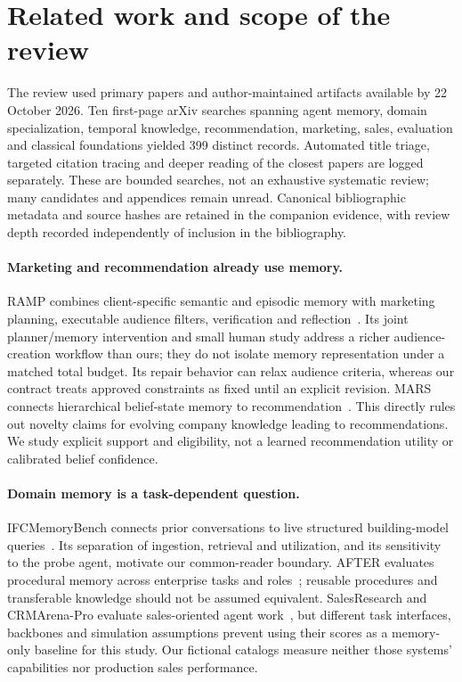 \section{Related work and scope of the review}
The review used primary papers and author-maintained artifacts available by 22 October 2026. Ten first-page arXiv searches spanning agent memory, domain specialization, temporal knowledge, recommendation, marketing, sales, evaluation and classical foundations yielded 399 distinct records. Automated title triage, targeted citation tracing and deeper reading of the closest papers are logged separately. These are bounded searches, not an exhaustive systematic review; many candidates and appendices remain unread. Canonical bibliographic metadata and source hashes are retained in the companion evidence, with review depth recorded independently of inclusion in the bibliography.

\paragraph{Marketing and recommendation already use memory.}
RAMP combines client-specific semantic and episodic memory with marketing planning, executable audience filters, verification and reflection~\citep{p250811120}. Its joint planner/memory intervention and small human study address a richer audience-creation workflow than ours; they do not isolate memory representation under a matched total budget. Its repair behavior can relax audience criteria, whereas our contract treats approved constraints as fixed until an explicit revision. MARS connects hierarchical belief-state memory to recommendation~\citep{p260514401}. This directly rules out novelty claims for evolving company knowledge leading to recommendations. We study explicit support and eligibility, not a learned recommendation utility or calibrated belief confidence.

\paragraph{Domain memory is a task-dependent question.}
IFCMemoryBench connects prior conversations to live structured building-model queries~\citep{p260726072}. Its separation of ingestion, retrieval and utilization, and its sensitivity to the probe agent, motivate our common-reader boundary. AFTER evaluates procedural memory across enterprise tasks and roles~\citep{p260623127}; reusable procedures and transferable knowledge should not be assumed equivalent. SalesResearch and CRMArena-Pro evaluate sales-oriented agent work~\citep{p260217017,p250518878}, but different task interfaces, backbones and simulation assumptions prevent using their scores as a memory-only baseline for this study. Our fictional catalogs measure neither those systems' capabilities nor production sales performance.

